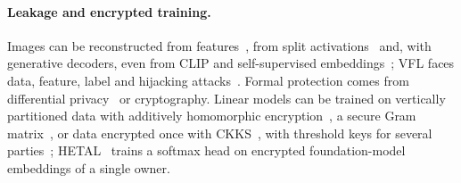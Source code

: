 \paragraph{Leakage and encrypted training.}
Images can be reconstructed from features~\cite{mahendran2015understanding,dosovitskiy2016inverting}, from split activations~\cite{he2019modelinversion} and, with generative decoders, even from CLIP and self-supervised embeddings~\cite{bordes2022rcdm,ramesh2022unclip,zheng2026rae,lei2025drag}; VFL faces data, feature, label and hijacking attacks~\cite{jin2021cafe,luo2021feature,fu2022label,li2022labelleakage,pasquini2021unleashing}. Formal protection comes from differential privacy~\cite{dwork2014algorithmic,dong2022gdp} or cryptography. Linear models can be trained on vertically partitioned data with additively homomorphic encryption~\cite{hardy2017private}, a secure Gram matrix~\cite{gascon2017privacy}, or data encrypted once with CKKS~\cite{kim2018logistic,han2019logistic}, with threshold keys for several parties~\cite{mouchet2021multiparty}; HETAL~\cite{lee2023hetal} trains a softmax head on encrypted foundation-model embeddings of a single owner.
